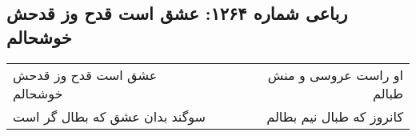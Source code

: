 \begin{center}
\section*{رباعی شماره ۱۲۶۴: عشق است قدح وز قدحش خوشحالم}
\label{sec:1264}
\begin{longtable}{l p{0.5cm} r}
عشق است قدح وز قدحش خوشحالم
&&
او راست عروسی و منش طبالم
\\
سوگند بدان عشق که بطال گر است
&&
کانروز که طبال نیم بطالم
\\
\end{longtable}
\end{center}
